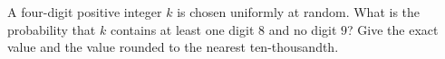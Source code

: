 A four-digit positive integer $k$ is chosen uniformly at random. What is the probability that $k$ contains at least one digit $8$ and no digit $9$? Give the exact value and the value rounded to the nearest ten-thousandth.
